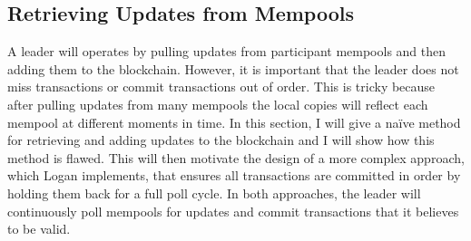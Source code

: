 \documentclass[12pt,a4paper,twoside,openright]{report}
\begin{document}
	\subsection{Retrieving Updates from Mempools}
	A leader will operates by pulling updates from participant mempools and then adding them to the blockchain.
	However, it is important that the leader does not miss transactions or commit transactions out of order.
	This is tricky because after pulling updates from many mempools the local copies will reflect each mempool at different moments in time.
	In this section, I will give a na\"{i}ve method for retrieving and adding updates to the blockchain and I will show how this method is flawed. 
	This will then motivate the design of a more complex approach, which Logan implements, that ensures all transactions are committed in order by holding them back for a full poll cycle.
	In both approaches, the leader will continuously poll mempools for updates and commit transactions that it believes to be valid. \\
	
\end{document}
